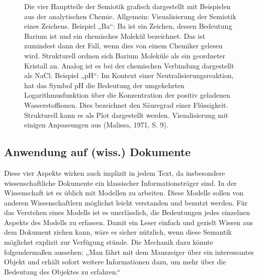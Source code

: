  
\begin{figure}[h!]
\centering
{}
\caption[Semiotik grafisch dargestellt]{ Die vier Hauptteile der Semiotik grafisch dargestellt mit Beispielen aus der analytischen Chemie. Allgemein: Visualisierung der Semiotik eines Zeichens. Beispiel „Ba“: Ba ist ein Zeichen, dessen Bedeutung Barium ist und ein chemisches Molekül bezeichnet. Das ist zumindest dann der Fall, wenn dies von einem Chemiker gelesen wird. Strukturell ordnen sich Barium Moleküle als ein geordneter Kristall an. Analog ist es bei der chemischen Verbindung dargestellt als NaCl. Beispiel „pH“: Im Kontext einer Neutralisierungsreaktion, hat das Symbol pH die Bedeutung der umgekehrten Logarithmusfunktion über die Konzentration der positiv geladenen Wasserstoffionen. Dies bezeichnet den Säuregrad einer Flüssigkeit. Strukturell kann es als Plot dargestellt werden. Visualisierung mit einigen Anpassungen aus (Malissa, 1971, S. 9). }\label{semiotik}
\end{figure}
 
\subsection{Anwendung auf (wiss.) Dokumente}\label{}
 
Diese vier Aspekte wirken auch implizit in jedem Text, da insbesondere wissenschaftliche Dokumente ein klassischer Informationsträger sind. In der Wissenschaft ist es üblich mit Modellen zu arbeiten. Diese Modelle sollen von anderen Wissenschaftlern möglichst leicht verstanden und benutzt werden. Für das Verstehen eines Modells ist es unerlässlich, die Bedeutungen jedes einzelnen Aspekts des Modells zu erfassen. Damit ein Leser einfach und gezielt Wissen aus dem Dokument ziehen kann, wäre es sicher nützlich, wenn diese Semantik möglichst explizit zur Verfügung stünde. Die Mechanik dazu könnte folgendermaßen aussehen: „Man fährt mit dem Mauszeiger über ein interessantes Objekt und erhält sofort weitere Informationen dazu, um mehr über die Bedeutung des Objektes zu erfahren.“

